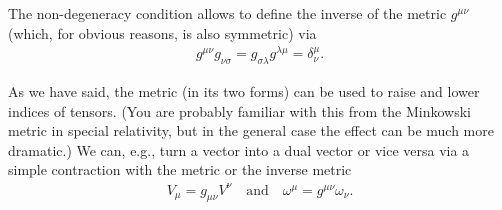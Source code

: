 The non-degeneracy condition allows to define the inverse of the metric $g^{\mu\nu}$
(which, for obvious reasons, is also symmetric) via
\begin{align}
  g^{\mu\nu} g_{\nu\sigma} = g_{\sigma\lambda}g^{\lambda\mu} = \delta^\mu_\nu.
\end{align}

As we have said, the metric (in its two forms) can be used to raise and lower
indices of tensors. (You are probably familiar with this from the Minkowski metric
in special relativity, but in the general case the effect can be much more dramatic.)
We can, e.g., turn a vector into a dual vector or vice versa via a simple contraction
with the metric or the inverse metric
\begin{align*}
  V_\mu = g_{\mu\nu} V^\nu \quad\text{and}\quad \omega^\mu = g^{\mu\nu}\omega_\nu.
\end{align*}

